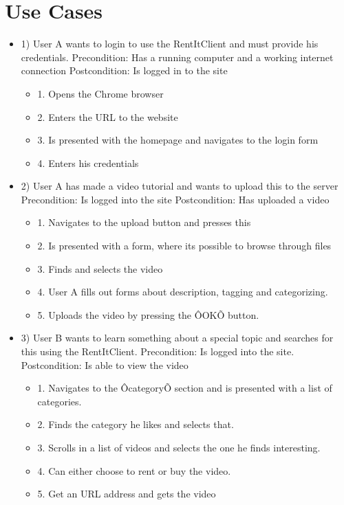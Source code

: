 \section{Use Cases}
\begin{itemize}

\item 1)
User A wants to login to use the RentItClient and must provide his credentials.
\newline Precondition: Has a running computer and a working internet connection
\newline Postcondition: Is logged in to the site
\begin{itemize} 
	\item 1. Opens the Chrome browser
	\item 2. Enters the URL to the website
	\item 3. Is presented with the homepage and navigates to the login form
	\item 4. Enters his credentials
\end{itemize}
\item 2)
User A has made a video tutorial and wants to upload this to the server
\newline Precondition: Is logged into the site
\newline Postcondition: Has uploaded a video
\begin{itemize} 
	\item 1. Navigates to the upload button and presses this
	\item 2. Is presented with a form, where its possible to browse through files
	\item 3. Finds and selects the video
	\item 4. User A fills out forms about description, tagging and categorizing.
	\item 5. Uploads the video by pressing the ÔOKÕ button. 
\end{itemize}
\item 3) 
User B wants to learn something about a special topic and searches for this using the RentItClient. 
\newline Precondition: Is logged into the site.
\newline Postcondition: Is able to view the video
\begin{itemize}
	\item 1. Navigates to the ÔcategoryÕ section and is presented with a list of categories. 
	\item 2. Finds the category he likes and selects that.
	\item 3. Scrolls in a list of videos and selects the one he finds interesting. 
	\item 4. Can either choose to rent or buy the video.
	\item 5. Get an URL address and gets the video
\end{itemize}


\end{itemize}
